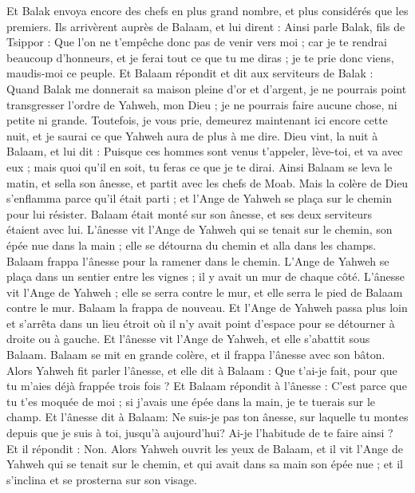 \begin{multicols}{2}
Et Balak envoya encore des chefs en plus grand nombre, et plus considérés que les premiers.
Ils arrivèrent auprès de Balaam, et lui dirent : Ainsi parle Balak, fils de Tsippor : Que l'on ne t'empêche donc pas de venir vers moi ;
car je te rendrai beaucoup d'honneurs, et je ferai tout ce que tu me diras ; je te prie donc viens, maudis-moi ce peuple.
Et Balaam répondit et dit aux serviteurs de Balak : Quand Balak me donnerait sa maison pleine d'or et d'argent, je ne pourrais point transgresser l'ordre de Yahweh, mon Dieu ; je ne pourrais faire aucune chose, ni petite ni grande.
Toutefois, je vous prie, demeurez maintenant ici encore cette nuit, et je saurai ce que Yahweh aura de plus à me dire.
Dieu vint, la nuit à Balaam, et lui dit : Puisque ces hommes sont venus t'appeler, lève-toi, et va avec eux ; mais quoi qu'il en soit, tu feras ce que je te dirai.
Ainsi Balaam se leva le matin, et sella son ânesse, et partit avec les chefs de Moab.
Mais la colère de Dieu s'enflamma parce qu'il était parti ; et l'Ange de Yahweh se plaça sur le chemin pour lui résister. Balaam était monté sur son ânesse, et ses deux serviteurs étaient avec lui.
L'ânesse vit l'Ange de Yahweh qui se tenait sur le chemin, son épée nue dans la main ; elle se détourna du chemin et alla dans les champs. Balaam frappa l'ânesse pour la ramener dans le chemin.
L'Ange de Yahweh se plaça dans un sentier entre les vignes ; il y avait un mur de chaque côté.
L'ânesse vit l'Ange de Yahweh ; elle se serra contre le mur, et elle serra le pied de Balaam contre le mur. Balaam la frappa de nouveau.
Et l'Ange de Yahweh passa plus loin et s'arrêta dans un lieu étroit où il n'y avait point d'espace pour se détourner à droite ou à gauche.
Et l'ânesse vit l'Ange de Yahweh, et elle s'abattit sous Balaam. Balaam se mit en grande colère, et il frappa l'ânesse avec son bâton.
Alors Yahweh fit parler l'ânesse, et elle dit à Balaam : Que t'ai-je fait, pour que tu m'aies déjà frappée trois fois ?
Et Balaam répondit à l'ânesse : C'est parce que tu t'es moquée de moi ; si j'avais une épée dans la main, je te tuerais sur le champ.
Et l'ânesse dit à Balaam: Ne suis-je pas ton ânesse, sur laquelle tu montes depuis que je suis à toi, jusqu'à aujourd'hui? Ai-je l'habitude de te faire ainsi ? Et il répondit : Non.
Alors Yahweh ouvrit les yeux de Balaam, et il vit l'Ange de Yahweh qui se tenait sur le chemin, et qui avait dans sa main son épée nue ; et il s'inclina et se prosterna sur son visage.

\end{multicols}
